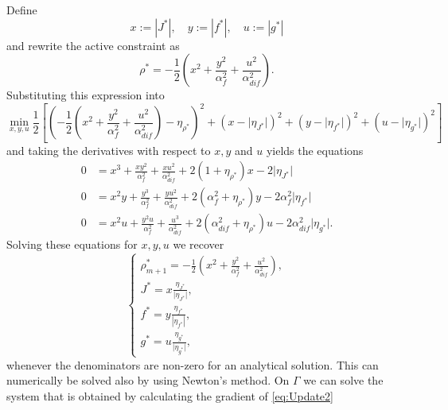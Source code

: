 Define
$$
x:= |J^*|,\quad y:= |f^*|,\quad u:=|g^*|
$$
and rewrite the active constraint as 
$$
\rho^* = -\frac{1}{2}\left(x^2+ \frac{y^2}{\alpha_f^2}+\frac{u^2}{\alpha_{dif}^2}\right).
$$
Substituting this expression into 
$$
\min_{x,y,u} \frac{1}{2}\left[ \left( -\frac{1}{2}\left(x^2 + \frac{y^2}{\alpha_f^2}+\frac{u^2}{\alpha_{dif}^2}\right) - \eta_{\rho^*}\right)^2 + (x-\lvert \eta_{J^*}\rvert)^2 + (y-\lvert\eta_{f^*}\rvert)^2 + (u- \lvert \eta_{g^*}\rvert)^2 \right]
$$
and taking the derivatives with respect to $x,y$ and $u$ yields the equations
\begin{align*}
	0&=x^3 + \frac{xy^2}{\alpha_f^2}+\frac{xu^2}{\alpha_{dif}^2}+2(1+\eta_{\rho^*})x - 2\lvert\eta_{J^*}\rvert\\
	0&=x^2y + \frac{y^3}{\alpha_f^2} + \frac{yu^2}{\alpha_{dif}^2} + 2(\alpha_f^2 + \eta_{\rho^*})y - 2\alpha_f^2\lvert\eta_{f^*}\rvert\\
	0&= x^2u + \frac{y^2u}{\alpha_f^2}+\frac{u^3}{\alpha_{dif}^2} + 2(\alpha_{dif}^2 + \eta_{\rho^*})u - 2\alpha_{dif}^2\lvert\eta_{g^*}\rvert.
\end{align*}
Solving these equations for $x,y,u$ we recover
$$
\begin{cases}
	\rho_{m+1}^* = -\frac{1}{2}\left(x^2 + \frac{y^2}{\alpha_f^2}+\frac{u^2}{\alpha_{dif}^2}\right),\\
	J^* = x\frac{\eta_{J^*}}{\lvert \eta_{J^*}\rvert},\\
	f^* = y\frac{\eta_{f^*}}{|\eta_{f^*}|},\\
	g^* = u\frac{\eta_{g^*}}{\lvert \eta_{g^*}\rvert},
\end{cases}
$$
whenever the denominators are non-zero for an analytical solution. This can numerically be solved also by using Newton's method. On $\Gamma$ we can solve the system that is obtained by calculating the gradient of \eqref{eq:Update2}
